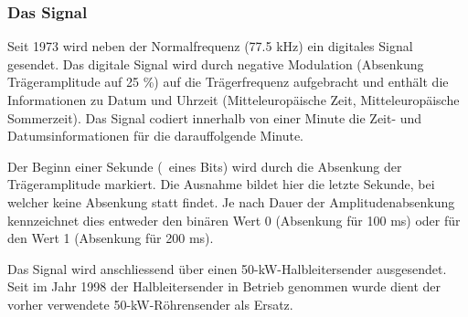 \subsubsection{Das Signal}
Seit 1973 wird neben der Normalfrequenz (77.5 kHz) ein digitales Signal gesendet. Das digitale Signal wird durch negative Modulation (Absenkung Trägeramplitude auf 25 \%) auf die Trägerfrequenz aufgebracht und enthält die Informationen zu Datum und Uhrzeit (Mitteleuropäische Zeit, Mitteleuropäische Sommerzeit). Das Signal codiert innerhalb von einer Minute die Zeit- und Datumsinformationen für die darauffolgende Minute.

Der Beginn einer Sekunde (~eines Bits) wird durch die Absenkung der Trägeramplitude markiert. Die Ausnahme bildet hier die letzte Sekunde, bei welcher keine Absenkung statt findet. Je nach Dauer der Amplitudenabsenkung kennzeichnet dies entweder den binären Wert 0 (Absenkung für 100 ms) oder für den Wert 1 (Absenkung für 200 ms).

Das Signal wird anschliessend über einen 50-kW-Halbleitersender ausgesendet. Seit im Jahr 1998 der Halbleitersender in Betrieb genommen wurde dient der vorher verwendete 50-kW-Röhrensender als Ersatz.

\begin{figure}
\end{figure}

